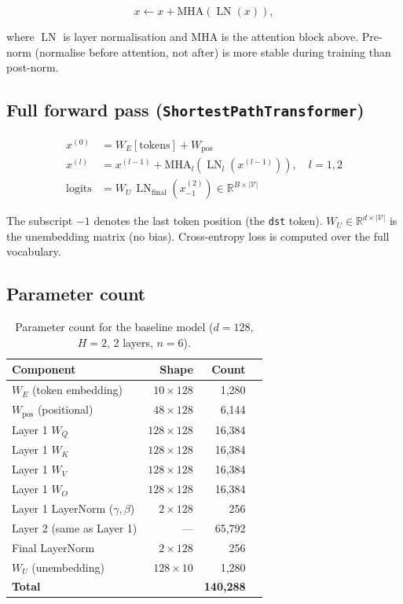 \documentclass[11pt, a4paper]{article}
\DeclareMathOperator{\LN}{LN}
\begin{document}
\[
  x \leftarrow x + \text{MHA}\!\left(\LN(x)\right),
\]

where $\LN$ is layer normalisation and MHA is the attention block above.
Pre-norm (normalise before attention, not after) is more stable during
training than post-norm.

\subsection{Full forward pass (\texttt{ShortestPathTransformer})}

\begin{align}
  x^{(0)} &= W_E[\text{tokens}] + W_{\text{pos}} \\
  x^{(l)} &= x^{(l-1)} + \text{MHA}_l\!\left(\LN_l\!\left(x^{(l-1)}\right)\right),
  \quad l = 1, 2 \\
  \text{logits} &= W_U\, \LN_{\text{final}}\!\left(x^{(2)}_{-1}\right)
  \in \mathbb{R}^{B \times |\mathcal{V}|}
\end{align}

The subscript $-1$ denotes the last token position (the \texttt{dst} token).
$W_U \in \mathbb{R}^{d \times |\mathcal{V}|}$ is the unembedding matrix (no
bias). Cross-entropy loss is computed over the full vocabulary.

\subsection{Parameter count}

\begin{table}[H]
\centering
\begin{tabular}{@{}lrrr@{}}
\toprule
Component & Shape & Count \\
\midrule
$W_E$ (token embedding)      & $10 \times 128$   & 1{,}280  \\
$W_{\text{pos}}$ (positional) & $48 \times 128$   & 6{,}144  \\
\midrule
Layer 1 $W_Q$                & $128 \times 128$  & 16{,}384 \\
Layer 1 $W_K$                & $128 \times 128$  & 16{,}384 \\
Layer 1 $W_V$                & $128 \times 128$  & 16{,}384 \\
Layer 1 $W_O$                & $128 \times 128$  & 16{,}384 \\
Layer 1 LayerNorm ($\gamma, \beta$) & $2 \times 128$ & 256  \\
\midrule
Layer 2 (same as Layer 1)    & ---               & 65{,}792 \\
\midrule
Final LayerNorm              & $2 \times 128$    & 256      \\
$W_U$ (unembedding)          & $128 \times 10$   & 1{,}280  \\
\midrule
\textbf{Total}               &                   & \textbf{140{,}288} \\
\bottomrule
\end{tabular}
\caption{Parameter count for the baseline model
  ($d=128$, $H=2$, 2 layers, $n=6$).}
\end{table}
\end{document}
